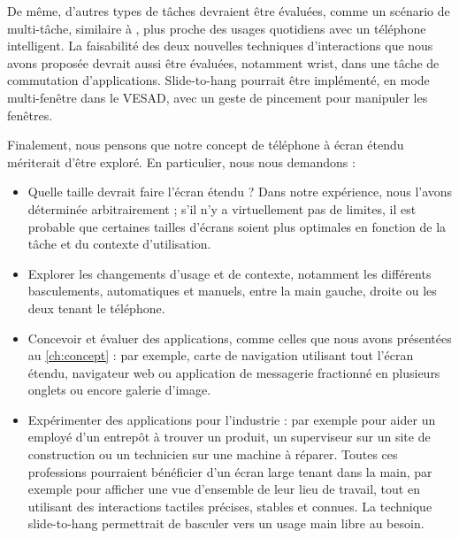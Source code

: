 
De même, d'autres types de tâches devraient être évaluées, comme un scénario de multi-tâche, similaire à \cite{Ens2014}, plus proche des usages quotidiens avec un téléphone intelligent. La faisabilité des deux nouvelles techniques d'interactions que nous avons proposée devrait aussi être évaluées, notamment wrist, dans une tâche de commutation d'applications. Slide-to-hang pourrait être implémenté, en mode multi-fenêtre dans le VESAD, avec un geste de pincement  pour manipuler les fenêtres.

Finalement, nous pensons que notre concept de téléphone à écran étendu mériterait d'être exploré. En particulier, nous nous demandons :
\begin{itemize}
  \item Quelle taille devrait faire l'écran étendu ? Dans notre expérience, nous l'avons déterminée arbitrairement ; s'il n'y a virtuellement pas de limites, il est probable que certaines tailles d'écrans soient plus optimales en fonction de la tâche et du contexte d'utilisation.
  \item Explorer les changements d'usage et de contexte, notamment les différents basculements, automatiques et manuels, entre la main gauche, droite ou les deux tenant le téléphone.
  \item Concevoir et évaluer des applications, comme celles que nous avons présentées au \autoref{ch:concept} : par exemple, carte de navigation utilisant tout l'écran étendu, navigateur web ou application de messagerie fractionné en plusieurs onglets ou encore galerie d'image.
  \item Expérimenter des applications pour l'industrie : par exemple pour aider un employé d'un entrepôt à trouver un produit, un superviseur sur un site de construction ou un technicien sur une machine à réparer. Toutes ces professions pourraient bénéficier d'un écran large tenant dans la main, par exemple pour afficher une vue d'ensemble de leur lieu de travail, tout en utilisant des interactions tactiles précises, stables et connues. La technique slide-to-hang permettrait de basculer vers un usage main libre au besoin.
\end{itemize}